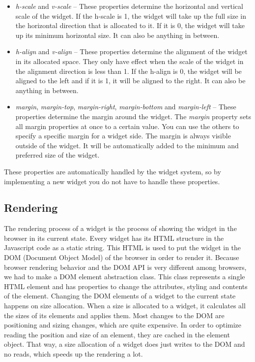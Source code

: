 \documentclass[11pt,a4paper]{article}
\begin{document}
\begin{itemize}
\item \textit{h-scale} and \textit{v-scale} -- These properties determine the horizontal and vertical scale of the widget.
If the h-scale is 1, the widget will take up the full size in the horizontal direction that is allocated to it.
If it is 0, the widget will take up its minimum horizontal size.
It can also be anything in between.

\item \textit{h-align} and \textit{v-align} -- These properties determine the alignment of the widget in its allocated space.
They only have effect when the scale of the widget in the alignment direction is less than 1.
If the h-align is 0, the widget will be aligned to the left and if it is 1, it will be aligned to the right.
It can also be anything in between.

\item \textit{margin}, \textit{margin-top}, \textit{margin-right}, \textit{margin-bottom} and \textit{margin-left} -- These properties determine the margin around the widget.
The \textit{margin} property sets all margin properties at once to a certain value.
You can use the others to specify a specific margin for a widget side.
The margin is always visible outside of the widget.
It will be automatically added to the minimum and preferred size of the widget.
\end{itemize}

These properties are automatically handled by the widget system, so by implementing a new widget you do not have to handle these properties.

\subsection{Rendering}

The rendering process of a widget is the process of showing the widget in the browser in its current state.
Every widget has its HTML structure in the Javascript code as a static string.
This HTML is used to put the widget in the DOM (Document Object Model) of the browser in order to render it.
Because browser rendering behavior and the DOM API is very different among browsers, we had to make a DOM element abstraction class.
This class represents a single HTML element and has properties to change the attributes, styling and contents of the element.
Changing the DOM elements of a widget to the current state happens on size allocation.
When a size is allocated to a widget, it calculates all the sizes of its elements and applies them.
Most changes to the DOM are positioning and sizing changes, which are quite expensive.
In order to optimize reading the position and size of an element, they are cached in the element object.
That way, a size allocation of a widget does just writes to the DOM and no reads, which speeds up the rendering a lot.
\end{document}
